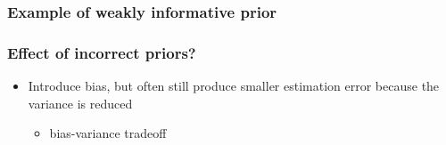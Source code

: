 \documentclass[10pt]{beamer}
\begin{document}
\begin{frame}
\frametitle{Example of weakly informative prior}

  \begin{center}
\end{center}
\end{frame}

\begin{frame}
\frametitle{Effect of incorrect priors?}

\begin{itemize}
  \item Introduce bias, but often still produce smaller estimation
    error because the variance is reduced
  \begin{itemize}
    \item bias-variance tradeoff
  \end{itemize}
\end{itemize}
\end{frame}
\end{document}

